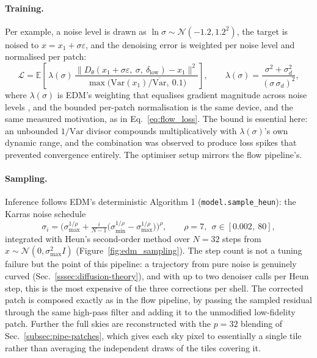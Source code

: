 \documentclass{report}
\begin{document}
\paragraph{Training.} Per example, a noise level is drawn as $\ln\sigma \sim \mathcal{N}(-1.2, 1.2^2)$, the target is noised to $x = x_1 + \sigma\varepsilon$, and the denoising error is weighted per noise level and normalised per patch:
\begin{equation}
  \mathcal{L} = \mathbb{E}\!\left[\, \lambda(\sigma)\,
      \frac{\big\lVert D_\theta(x_1 + \sigma\varepsilon,\ \sigma,\ \delta_{\mathrm{low}}) - x_1 \big\rVert^2}
           {\max\!\big(\mathrm{Var}(x_1)/\overline{\mathrm{Var}},\ 0.1\big)} \right],
  \qquad
  \lambda(\sigma) = \frac{\sigma^2 + \sigma_d^2}{(\sigma\,\sigma_d)^2},
  \label{eq:edm_loss}
\end{equation}
where $\lambda(\sigma)$ is EDM's weighting that equalises gradient magnitude across noise levels \cite{karras_elucidating_2022}, and the bounded per-patch normalisation is the same device, and the same measured motivation, as in Eq.~\eqref{eq:flow_loss}. The bound is essential here: an unbounded $1/\mathrm{Var}$ divisor compounds multiplicatively with $\lambda(\sigma)$'s own dynamic range, and the combination was observed to produce loss spikes that prevented convergence entirely. The optimiser setup mirrors the flow pipeline's.

\paragraph{Sampling.} Inference follows EDM's deterministic Algorithm 1 (\texttt{model.sample\_heun}): the Karras noise schedule
\begin{equation}
  \sigma_i = \Big(\sigma_{\max}^{1/\rho} + \tfrac{i}{N-1}\big(\sigma_{\min}^{1/\rho} - \sigma_{\max}^{1/\rho}\big)\Big)^{\rho},
  \qquad \rho = 7,\ \ \sigma \in [0.002,\ 80],
  \label{eq:karras_schedule}
\end{equation}
integrated with Heun's second-order method over $N = 32$ steps from $x \sim \mathcal{N}(0, \sigma_{\max}^2 I)$ (Figure~\ref{fig:edm_sampling}). The step count is not a tuning failure but the point of this pipeline: a trajectory from pure noise is genuinely curved (Sec.~\ref{sssec:diffusion-theory}), and with up to two denoiser calls per Heun step, this is the most expensive of the three corrections per shell. The corrected patch is composed exactly as in the flow pipeline, by passing the sampled residual through the same high-pass filter and adding it to the unmodified low-fidelity patch. Further the full skies are reconstructed with the \mbox{$p=32$} blending of Sec.~\ref{subsec:pipe-patches}, which gives each sky pixel to essentially a single tile rather than averaging the independent draws of the tiles covering it.
\end{document}
